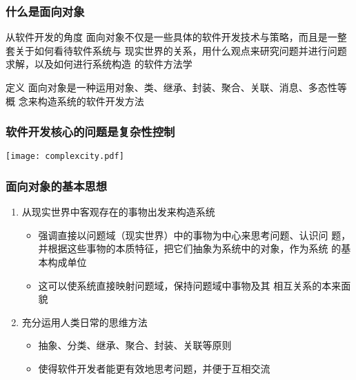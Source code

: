 \documentclass[compress]{beamer}
\begin{document}
\begin{frame}
\frametitle{什么是面向对象}

\begin{block}{从软件开发的角度}
面向对象不仅是一些具体的软件开发技术与策略，而且是一整套关于如何看待软件系统与
现实世界的关系，用什么观点来研究问题并进行问题求解，以及如何进行系统构造
的软件方法学
\end{block}

\pause

\begin{block}{定义}
面向对象是一种运用对象、类、继承、封装、聚合、关联、消息、多态性等概
念来构造系统的软件开发方法
\end{block}
\end{frame}

%


\begin{frame}
  \frametitle{软件开发核心的问题是复杂性控制}
  \begin{center}
    \centering\texttt{[image: complexcity.pdf]}
  \end{center}
\end{frame}

\begin{frame}
\frametitle{面向对象的基本思想}
\begin{enumerate}
  \item 从现实世界中客观存在的事物出发来构造系统
    \begin{itemize}
      \item 强调直接以问题域（现实世界）中的事物为中心来思考问题、认识问
        题，并根据这些事物的本质特征，把它们抽象为系统中的对象，作为系统
        的基本构成单位
      \item 这可以使系统直接映射问题域，保持问题域中事物及其
        相互关系的本来面貌
    \end{itemize}
  \item 充分运用人类日常的思维方法
    \begin{itemize}
      \item 抽象、分类、继承、聚合、封装、关联等原则
      \item 使得软件开发者能更有效地思考问题，并便于互相交流
    \end{itemize}
\end{enumerate}
\end{frame}
\end{document}
